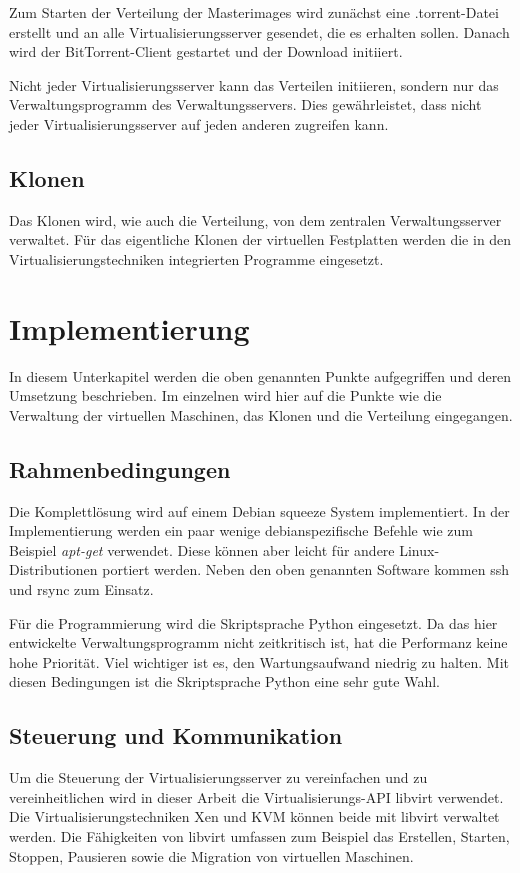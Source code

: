 Zum Starten der Verteilung der Masterimages wird zunächst eine .torrent-Datei erstellt und an alle Virtualisierungsserver gesendet, die es erhalten sollen. Danach wird der BitTorrent-Client gestartet und der Download initiiert.

Nicht jeder Virtualisierungsserver kann das Verteilen initiieren, sondern nur das Verwaltungsprogramm des Verwaltungsservers. Dies gewährleistet, dass nicht jeder Virtualisierungsserver auf jeden anderen zugreifen kann.

\subsection{Klonen}
Das Klonen wird, wie auch die Verteilung, von dem zentralen Verwaltungsserver verwaltet. Für das eigentliche Klonen der virtuellen Festplatten werden die in den Virtualisierungstechniken integrierten Programme eingesetzt. 

\section{Implementierung}
In diesem Unterkapitel werden die oben genannten Punkte aufgegriffen und deren Umsetzung beschrieben. Im einzelnen wird hier auf die Punkte wie die Verwaltung der virtuellen Maschinen, das Klonen und die Verteilung eingegangen.

\subsection{Rahmenbedingungen}
Die Komplettlösung wird auf einem Debian squeeze System implementiert. In der Implementierung werden ein paar wenige debianspezifische Befehle wie zum Beispiel \textit{apt-get} verwendet. Diese können aber leicht für andere Linux-Distributionen portiert werden. Neben den oben genannten Software kommen ssh und rsync zum Einsatz.

Für die Programmierung wird die Skriptsprache Python eingesetzt. Da das hier entwickelte Verwaltungsprogramm nicht zeitkritisch ist, hat die Performanz keine hohe Priorität. Viel wichtiger ist es, den Wartungsaufwand niedrig zu halten. Mit diesen Bedingungen ist die Skriptsprache Python eine sehr gute Wahl.

\subsection{Steuerung und Kommunikation}
Um die Steuerung der Virtualisierungsserver zu vereinfachen und zu vereinheitlichen wird in dieser Arbeit die Virtualisierungs-API libvirt verwendet. Die Virtualisierungstechniken Xen und KVM können beide mit libvirt verwaltet werden. Die Fähigkeiten von libvirt umfassen zum Beispiel das Erstellen, Starten, Stoppen, Pausieren sowie die Migration von virtuellen Maschinen. 

